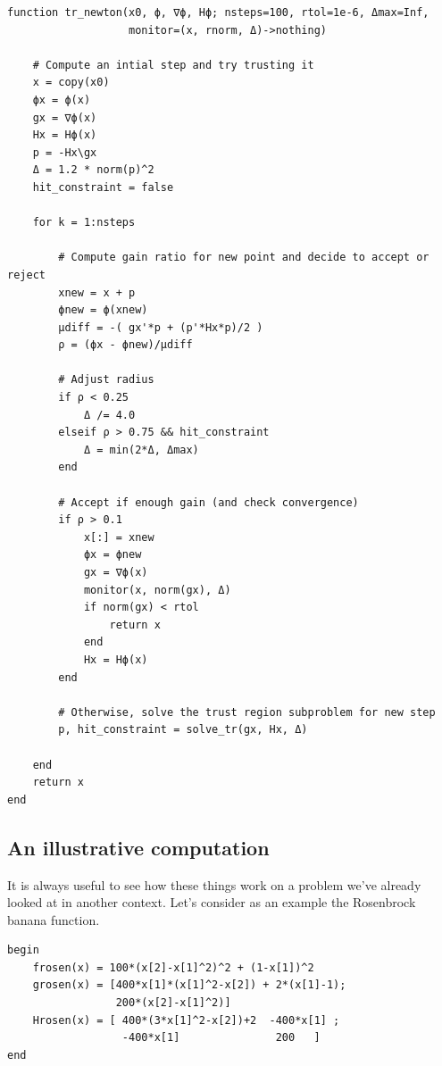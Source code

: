 \documentclass[12pt, leqno]{article} %
\begin{document}
\begin{verbatim}
function tr_newton(x0, ϕ, ∇ϕ, Hϕ; nsteps=100, rtol=1e-6, Δmax=Inf,
                   monitor=(x, rnorm, Δ)->nothing)
    
    # Compute an intial step and try trusting it
    x = copy(x0)
    ϕx = ϕ(x)
    gx = ∇ϕ(x)
    Hx = Hϕ(x)
    p = -Hx\gx
    Δ = 1.2 * norm(p)^2
    hit_constraint = false
    
    for k = 1:nsteps

        # Compute gain ratio for new point and decide to accept or reject
        xnew = x + p
        ϕnew = ϕ(xnew)
        μdiff = -( gx'*p + (p'*Hx*p)/2 )
        ρ = (ϕx - ϕnew)/μdiff
        
        # Adjust radius
        if ρ < 0.25
            Δ /= 4.0
        elseif ρ > 0.75 && hit_constraint
            Δ = min(2*Δ, Δmax)
        end
        
        # Accept if enough gain (and check convergence)
        if ρ > 0.1
            x[:] = xnew
            ϕx = ϕnew
            gx = ∇ϕ(x)
            monitor(x, norm(gx), Δ)
            if norm(gx) < rtol
                return x
            end
            Hx = Hϕ(x)
        end

        # Otherwise, solve the trust region subproblem for new step
        p, hit_constraint = solve_tr(gx, Hx, Δ)

    end
    return x
end
\end{verbatim}

\subsection{An illustrative computation}

It is always useful to see how these things work on a problem we've
already looked at in another context. Let's consider as an example the
Rosenbrock banana function.

\begin{verbatim}
begin
    frosen(x) = 100*(x[2]-x[1]^2)^2 + (1-x[1])^2
    grosen(x) = [400*x[1]*(x[1]^2-x[2]) + 2*(x[1]-1);
    	         200*(x[2]-x[1]^2)]
    Hrosen(x) = [ 400*(3*x[1]^2-x[2])+2  -400*x[1] ;
    	          -400*x[1]               200   ]
end
\end{verbatim}
\end{document}
